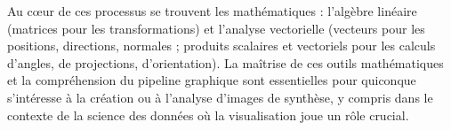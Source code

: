 \documentclass{article}
\begin{document}
Au cœur de ces processus se trouvent les mathématiques : l'algèbre linéaire (matrices pour les transformations) et l'analyse vectorielle (vecteurs pour les positions, directions, normales ; produits scalaires et vectoriels pour les calculs d'angles, de projections, d'orientation). La maîtrise de ces outils mathématiques et la compréhension du pipeline graphique sont essentielles pour quiconque s'intéresse à la création ou à l'analyse d'images de synthèse, y compris dans le contexte de la science des données où la visualisation joue un rôle crucial.
\end{document}
